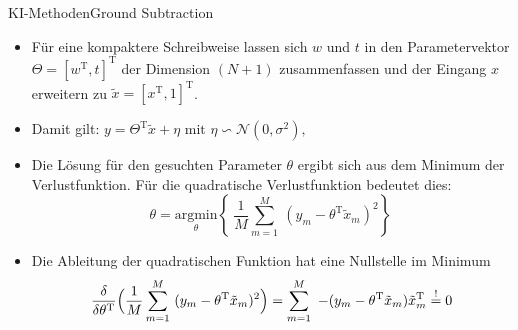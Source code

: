 \documentclass[169, handout	]{THIbeamer} %
\begin{document}
\begin{frame}{KI-Methoden}{Ground Subtraction}
	\footnotesize
	\begin{itemize}			
		\item Für eine kompaktere Schreibweise lassen sich $w$ und $t$ in den Parametervektor $\Theta = [w^{\text{T}}, t]^{\text{T}}$ der Dimension $(N+1)$ zusammenfassen und der Eingang $x$ erweitern zu $ \tilde{x} = [x^{\text{T}}, 1]^{\text{T}}$.
		\item Damit gilt: $
		y = \Theta^{\text{T}} \tilde{x} + \eta \text{ mit } \eta \backsim \mathcal{N}(0, \sigma^2) \text{,} $
		\item Die Lösung für den gesuchten Parameter $\theta$ ergibt sich aus dem Minimum der Verlustfunktion. Für die quadratische Verlustfunktion bedeutet dies:
		\begin{equation}
			\theta = \underset{\theta}{\mathrm{argmin}} \left\{\ \frac{1}{M} \sum_{m=1}^M\ (y_m - \theta^{\text{T}} \tilde{x}_m)^2 \right\}\
		\end{equation}
		\item Die Ableitung der quadratischen Funktion hat eine Nullstelle im Minimum					\begin{equation}
			\frac{\delta}{\delta \theta^{\text{T}}} \Bigl( \frac{1}{M} \sum_{m=1}^M\ (y_m - \theta^{\text{T}} \tilde{x}_m)^2 \Bigr) 
			= \sum_{m=1}^M\ -(y_m - \theta^{\text{T}} \tilde{x}_m) \tilde{x}_m^{\text{T}}
			\stackrel{!}{=} 0 
		\end{equation}
		
	\end{itemize}
\end{frame}
\end{document}
